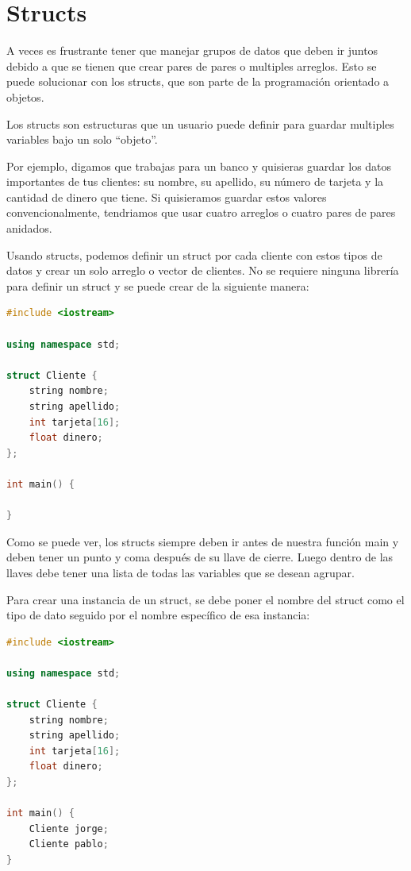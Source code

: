 \documentclass{article}
\begin{document}
\section{Structs}

A veces es frustrante tener que manejar grupos de datos que deben ir juntos debido a que se tienen que crear pares de pares o multiples arreglos. Esto se puede solucionar con los structs, que son parte de la programación orientado a objetos.

Los structs son estructuras que un usuario puede definir para guardar multiples variables bajo un solo ``objeto''.

Por ejemplo, digamos que trabajas para un banco y quisieras guardar los datos importantes de tus clientes: su nombre, su apellido, su número de tarjeta y la cantidad de dinero que tiene. Si quisieramos guardar estos valores convencionalmente, tendriamos que usar cuatro arreglos o cuatro pares de pares anidados.

Usando structs, podemos definir un struct por cada cliente con estos tipos de datos y crear un solo arreglo o vector de clientes. No se requiere ninguna librería para definir un struct y se puede crear de la siguiente manera:

\begin{lstlisting}[language=C++, title=Definición de un struct]
#include <iostream>

using namespace std;

struct Cliente {
	string nombre;
	string apellido;
	int tarjeta[16];
	float dinero;
};

int main() {

}
\end{lstlisting}

Como se puede ver, los structs siempre deben ir antes de nuestra función main y deben tener un punto y coma después de su llave de cierre. Luego dentro de las llaves debe tener una lista de todas las variables que se desean agrupar.

Para crear una instancia de un struct, se debe poner el nombre del struct como el tipo de dato seguido por el nombre específico de esa instancia:

\begin{lstlisting}[language=C++, title=Instanciamiento]
#include <iostream>

using namespace std;

struct Cliente {
	string nombre;
	string apellido;
	int tarjeta[16];
	float dinero;
};

int main() {
	Cliente jorge;
	Cliente pablo;
}
\end{lstlisting}
\end{document}
